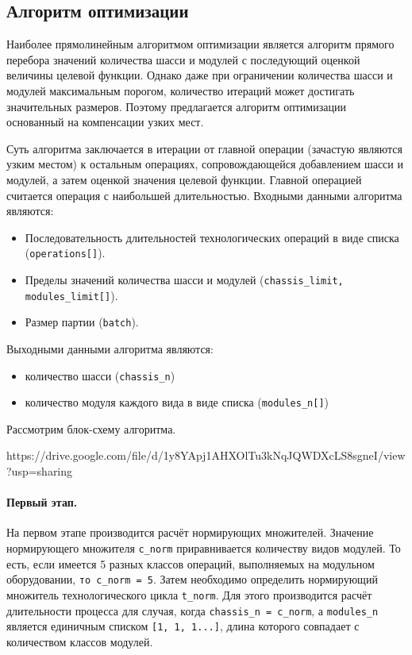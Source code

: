 \subsection{Алгоритм оптимизации}

Наиболее прямолинейным алгоритмом оптимизации является алгоритм прямого перебора значений количества шасси и модулей с последующий оценкой величины целевой функции. Однако даже при ограничении количества шасси и модулей максимальным порогом, количество итераций может достигать значительных размеров. Поэтому предлагается алгоритм оптимизации основанный на компенсации узких мест.

Суть алгоритма заключается в итерации от главной операции (зачастую являются узким местом) к остальным операциях, сопровождающейся добавлением шасси и модулей, а затем оценкой значения целевой функции. Главной операцией считается операция с наибольшей длительностью. Входными данными алгоритма являются:

\begin{itemize}
	\item Последовательность длительностей технологических операций в виде списка (\texttt{operations[]}).
	\item Пределы значений количества шасси и модулей (\texttt{chassis\_limit, modules\_limit[]}).
	\item Размер партии (\texttt{batch}).
\end{itemize}


Выходными данными алгоритма являются:
\begin{itemize}
	\item количество шасси (\texttt{chassis\_n})
	\item количество модуля каждого вида в виде списка (\texttt{modules\_n[]})
\end{itemize}


Рассмотрим блок-схему алгоритма.

https://drive.google.com/file/d/1y8YApj1AHXOlTu3kNqJQWDXcLS8sgneI/view?usp=sharing

\paragraph{Первый этап.} На первом этапе производится расчёт нормирующих множителей. Значение нормирующего множителя \texttt{c\_norm} приравнивается  количеству видов модулей. То есть, если имеется 5 разных классов операций, выполняемых на модульном оборудовании, \texttt{то c\_norm = 5}. Затем необходимо определить нормирующий множитель технологического цикла \texttt{t\_norm}. Для этого производится расчёт длительности процесса для случая, когда \texttt{chassis\_n = c\_norm}, а \texttt{modules\_n} является единичным списком \texttt{[1, 1, 1...]}, длина которого совпадает с количеством классов модулей.  
 

